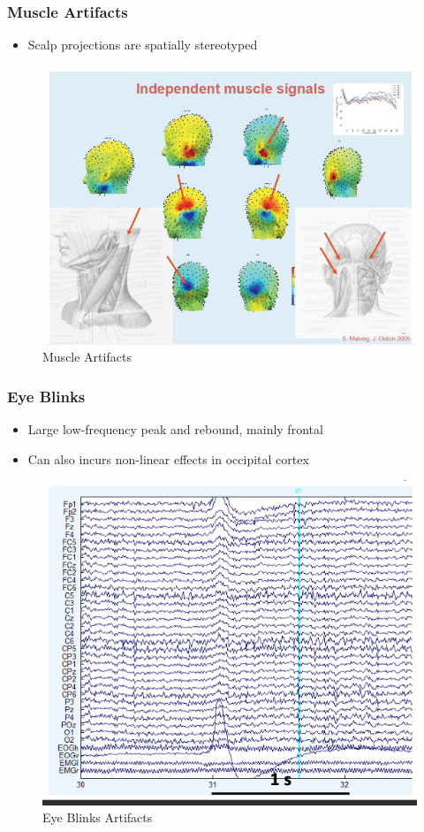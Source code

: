 \documentclass{beamer}
\begin{document}
\begin{frame}
\frametitle{Muscle Artifacts}
\begin{itemize}
	\item Scalp projections are spatially stereotyped
\end{itemize}
\begin{figure}
	\includegraphics[width=0.6\linewidth]{image/emg2}
	\caption{Muscle Artifacts}
\end{figure}
\end{frame}

\begin{frame}
\frametitle{Eye Blinks}
\begin{itemize}
	\item Large low-frequency peak and rebound, mainly frontal
	\item Can also incurs non-linear effects in occipital cortex
\end{itemize}
\begin{figure}
	\includegraphics[width=0.5\linewidth]{image/eog}
	\caption{Eye Blinks Artifacts}
\end{figure}
\end{frame}
\end{document}
